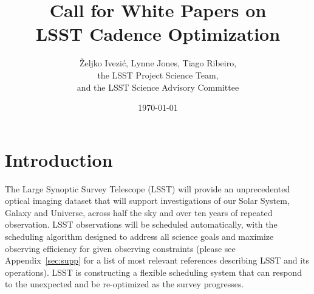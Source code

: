\documentclass[DM,lsstdraft,toc,usenatbib]{lsstdoc}
\title[Call for LSST Cadence White Papers]{Call for White Papers on \\ LSST Cadence Optimization}
\author{\v{Z}eljko Ivezi\'{c}, Lynne Jones, Tiago Ribeiro, \\
                 the LSST Project Science Team, \\
                 and  the LSST Science Advisory Committee}
\date{\today}
\begin{document}
\maketitle


\section{Introduction} 

The Large Synoptic Survey Telescope (LSST) will provide an unprecedented optical 
imaging dataset that will support investigations of our Solar System, Galaxy and Universe, 
across half the sky and over ten years of repeated observation. LSST observations will be
scheduled automatically, with the scheduling algorithm designed to address all science goals 
and maximize observing efficiency for given observing constraints (please see Appendix~\ref{sec:supp}
for a list of most relevant references describing LSST and its operations). LSST is constructing a 
flexible scheduling system that can respond to the unexpected and be re-optimized as the survey progresses.
\end{document}

